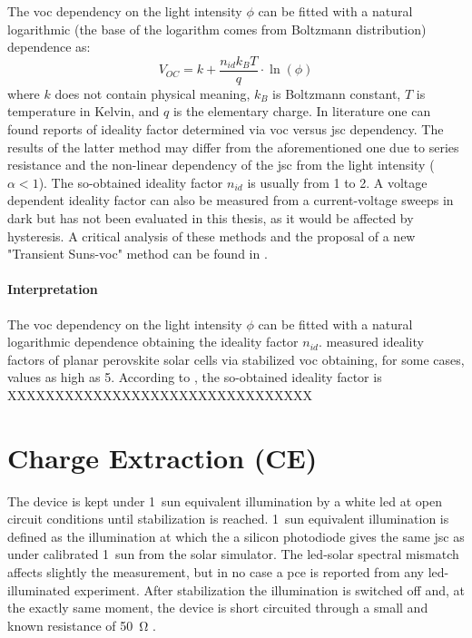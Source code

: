 The \gls{voc} dependency on the light intensity $\phi$ can be fitted with a natural logarithmic (the base of the logarithm comes from Boltzmann distribution) dependence as:
$$V_{OC} = k + \frac{n_{id} k_B T}{q}\cdot\ln(\phi)$$
where $k$ does not contain physical meaning, %
$k_B$ is Boltzmann constant, $T$ is temperature in Kelvin, and $q$ is the elementary charge\cite{Calado2018b}. In literature one can found reports of ideality factor determined via \gls{voc} versus \gls{jsc} dependency. The results of the latter method may differ from the aforementioned one due to series resistance and the non-linear dependency of the \gls{jsc} from the light intensity ($\alpha < 1$). The so-obtained ideality factor $n_{id}$ is usually from 1 to 2. A voltage dependent ideality factor can also be measured from a current-voltage sweeps in dark but has not been evaluated in this thesis, as it would be affected by hysteresis. A critical analysis of these methods and the proposal of a new "Transient Suns-\gls{voc}" method can be found in . %

\paragraph{Interpretation} The \gls{voc} dependency on the light intensity $\phi$ can be fitted with a natural logarithmic dependence obtaining the ideality factor $n_{id}$.  measured ideality factors of planar perovskite solar cells via stabilized \gls{voc} obtaining, for some cases, values as high as 5. According to , the so-obtained ideality factor is XXXXXXXXXXXXXXXXXXXXXXXXXXXXXXXX

\section{Charge Extraction (CE)}

The device is kept under 1~sun equivalent illumination by a white \gls{led} at open circuit conditions until stabilization is reached. 1~sun equivalent illumination is defined as the illumination at which the a silicon photodiode gives the same \gls{jsc} as under calibrated 1~sun from the solar simulator. The \gls{led}-solar spectral mismatch affects slightly the measurement, but in no case a \gls{pce} is reported from any \gls{led}-illuminated experiment. After stabilization the illumination is switched off and, at the exactly same moment, the device is short circuited through a small and known resistance of \SI{50}{\ohm} \cite{Duffy2000}.

